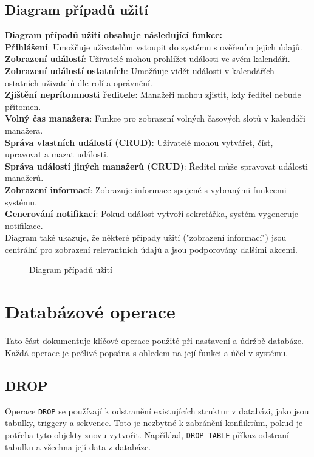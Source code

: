\documentclass[11pt,a4paper]{article}
\begin{document}
    \subsection{Diagram případů užití}
    \textbf{Diagram případů užití obsahuje následující funkce:}\\
    \textbf{Přihlášení}: Umožňuje uživatelům vstoupit do systému s ověřením jejich údajů.\\
    \textbf{Zobrazení událostí}: Uživatelé mohou prohlížet události ve svém kalendáři.\\
    \textbf{Zobrazení událostí ostatních}: Umožňuje vidět události v kalendářích ostatních uživatelů dle rolí a oprávnění.\\
    \textbf{Zjištění neprítomnosti ředitele}: Manažeři mohou zjistit, kdy ředitel nebude přítomen.\\
    \textbf{Volný čas manažera}: Funkce pro zobrazení volných časových slotů v kalendáři manažera.\\
    \textbf{Správa vlastních událostí (CRUD)}: Uživatelé mohou vytvářet, číst, upravovat a mazat události.\\
    \textbf{Správa událostí jiných manažerů (CRUD)}: Ředitel může spravovat události manažerů.\\
    \textbf{Zobrazení informací}: Zobrazuje informace spojené s vybranými funkcemi systému.\\
    \textbf{Generování notifikací}: Pokud událost vytvoří sekretářka, systém vygeneruje notifikace.\\
    Diagram také ukazuje, že některé případy užití ("zobrazení informací") jsou centrální pro zobrazení relevantních údajů a jsou podporovány dalšími akcemi.


    \begin{figure}[h]
    \centering
    
    \caption{Diagram případů užití}
    \end{figure}
    \newpage

    \section{Databázové operace}
Tato část dokumentuje klíčové operace použité při nastavení a údržbě databáze. Každá operace je pečlivě popsána s ohledem na její funkci a účel v systému.

\subsection{DROP}
Operace \texttt{DROP} se používají k odstranění existujících struktur v databázi, jako jsou tabulky, triggery a sekvence. Toto je nezbytné k zabránění konfliktům, pokud je potřeba tyto objekty znovu vytvořit. Například, \texttt{DROP TABLE} příkaz odstraní tabulku a všechna její data z databáze.
\end{document}
